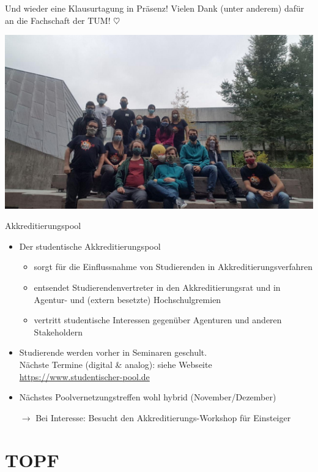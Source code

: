\documentclass[compress, aspectratio=169]{beamer}
\begin{document}
\begin{frame}
\centering
Und wieder eine Klausurtagung in Präsenz! Vielen Dank (unter anderem) dafür an die Fachschaft der TUM! $\heartsuit$
\vspace{.5cm}

\includegraphics[width=.6\textwidth]{klausurtagung.jpg}
\end{frame}


\begin{frame}{Akkreditierungspool}
    \begin{itemize}
        \item Der studentische Akkreditierungspool
        \begin{itemize}
        	\item sorgt für die Einflussnahme von Studierenden in Akkreditierungsverfahren
        	\item entsendet Studierendenvertreter in den Akkreditierungsrat und in Agentur- und (extern besetzte) Hochschulgremien
        	\item vertritt studentische Interessen gegenüber Agenturen und anderen Stakeholdern
        \end{itemize}         
        \item Studierende werden vorher in Seminaren geschult. \\
          {\scriptsize\color{blue} Nächste Termine (digital \& analog): siehe Webseite \url{https://www.studentischer-pool.de}}
        \item Nächstes Poolvernetzungstreffen wohl hybrid {\color{blue} (November/Dezember)}
        \vspace{0.5cm}
        \item[$\rightarrow$] Bei Interesse: Besucht den Akkreditierungs-Workshop für Einsteiger
    \end{itemize}
\end{frame}


\section{TOPF}
\end{document}
